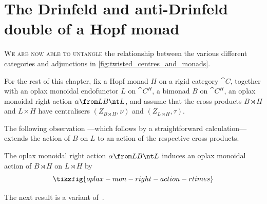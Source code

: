 \section{The Drinfeld and anti-Drinfeld double of a Hopf monad}\label{subsec: Drinfeld_anti-Drinfeld_double}

\textsc{We are now able to untangle}
the relationship between the various different categories and adjunctions in \cref{fig:twisted_centres_and_monads}.

\begin{hypothesis}
  For the rest of this chapter, fix a Hopf monad \(H\) on a rigid category \(\cat{C}\),
  together with an oplax monoidal endofunctor \(L\) on \(\cat{C}^H\),
  a bimonad \(B\) on \(\cat{C}^H\),
  an oplax monoidal right action \(\alpha \from LB \nt L\),
  and assume that the cross products \(B \rtimes H\) and \(L \rtimes H\) have centralisers \((Z_{B \rtimes H}, \nu)\) and \((Z_{L \rtimes H}, \tau)\).
\end{hypothesis}

The following observation%
—which follows by a straightforward calculation—%
extends the action of \(B\) on \(L\) to an action of the respective cross products.

\begin{lemma}\label{lem: cross_products_and_oplax_monoidal_actions}
  The oplax monoidal right action \(\alpha \from LB \nt L\) induces an oplax monoidal action of \(B \rtimes H\) on \(L \rtimes H\) by
  \[
    \tikzfig{oplax-mon-right-action-rtimes}
  \]
\end{lemma}

The next result is a variant of~\cite[Theorem~7.4]{Bruguieres2012}.

